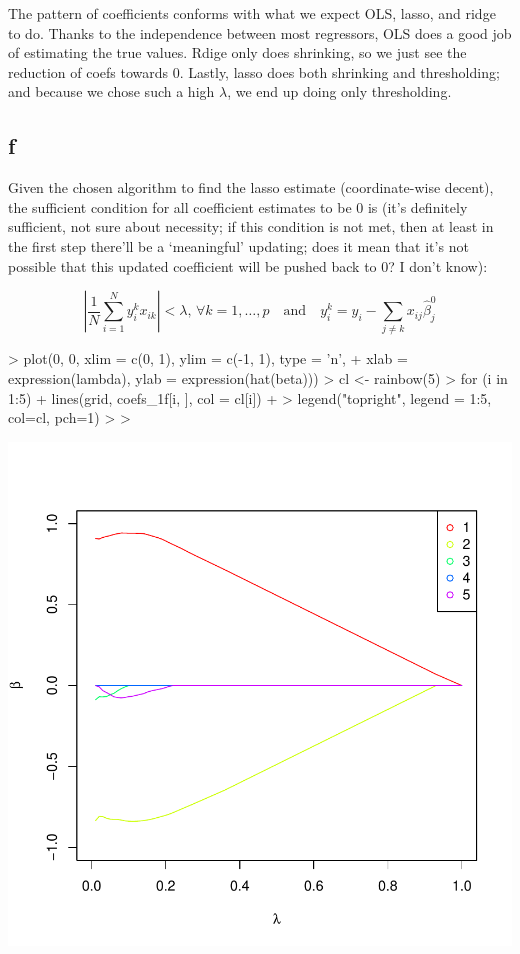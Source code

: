 \documentclass[a4paper,12pt,twoside]{article}
\begin{document}
The pattern of coefficients conforms with what we expect OLS, lasso, and ridge to do.
Thanks to the independence between most regressors, OLS does a good job of estimating the true values. Rdige only does shrinking, so we just see the reduction of coefs towards $0$. Lastly, lasso does both shrinking and thresholding; and because we chose such a high $\lambda$, we end up doing only thresholding.


\subsection*{f}

Given the chosen algorithm to find the lasso estimate (coordinate-wise decent), the sufficient condition for all coefficient estimates to be $0$ is (it's definitely sufficient, not sure about necessity; if this condition is not met, then at least in the first step there'll be a `meaningful' updating; does it mean that it's not possible that this updated coefficient will be pushed back to $0$? I don't know):

\begin{equation}
	\left|\frac{1}{N} \sum_{i = 1}^N y_i^k x_{ik} \right| < \lambda, \, \forall k = 1, \dots, p \quad \textrm{and} \quad y_i^k = y_i - \sum_{j \neq k} x_{ij}  \hat\beta_j^0
\end{equation}

\begin{Schunk}
\begin{Sinput}
> plot(0, 0, xlim = c(0, 1), ylim = c(-1, 1), type = 'n',
+      xlab = expression(lambda), ylab = expression(hat(beta)))
> cl <- rainbow(5)
> for (i in 1:5) {
+   lines(grid, coefs_1f[i, ], col = cl[i])
+ }
> legend("topright", legend = 1:5, col=cl, pch=1)
> 
> 
\end{Sinput}
\end{Schunk}
\includegraphics{ps2-004}
\end{document}
